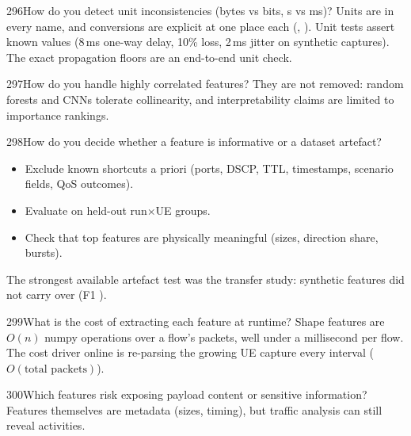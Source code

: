 \begin{qa}{296}{How do you detect unit inconsistencies (bytes vs bits, s vs ms)?}
Units are in every name, and conversions are explicit at one place each (, ). Unit tests
assert known values (8\,ms one-way delay, 10\% loss, 2\,ms jitter on synthetic captures). The exact propagation floors
are an end-to-end unit check.
\end{qa}

\begin{qa}{297}{How do you handle highly correlated features?}
They are not removed: random forests and CNNs tolerate collinearity, and interpretability claims are limited to
importance rankings.
\end{qa}

\begin{qa}{298}{How do you decide whether a feature is informative or a dataset artefact?}
\begin{itemize}
\item Exclude known shortcuts a priori (ports, DSCP, TTL, timestamps, scenario fields, QoS outcomes).
\item Evaluate on held-out run$\times$UE groups.
\item Check that top features are physically meaningful (sizes, direction share, bursts).
\end{itemize}
The strongest available artefact test was the transfer study: synthetic features did not carry over (F1 \NTrZero).
\end{qa}

\begin{qa}{299}{What is the cost of extracting each feature at runtime?}
Shape features are $O(n)$ numpy operations over a flow's packets, well under a millisecond per flow. The cost driver
online is re-parsing the growing UE capture every interval ($O(\text{total packets})$).
\end{qa}

\begin{qa}{300}{Which features risk exposing payload content or sensitive information?}
Features themselves are metadata (sizes, timing), but traffic analysis can still reveal activities.
\end{qa}

